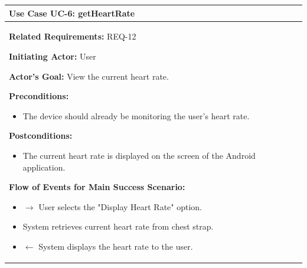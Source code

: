 \documentclass[letterpaper,english, 12pt]{scrreprt}
\begin{document}
\begin{center}
        \begin{tabular}{|C{15cm}|}
                \hline
                        \textbf{Use Case UC-6: getHeartRate}\\
                \hline
                        \begin{flushleft}
                                \textbf{Related Requirements: } REQ-12
                        \end{flushleft}
                        \begin{flushleft}
                                \textbf{Initiating Actor: } User
                        \end{flushleft}
                        \begin{flushleft}
                                \textbf{Actor's Goal: } View the current heart rate.
                        \end{flushleft}
                        \begin{flushleft}
                                \textbf{Preconditions: }
                        \end{flushleft}
                                \begin{itemize}
                                        \item The device should already be monitoring the user's heart rate.
                                \end{itemize}
                        \begin{flushleft}
                                \textbf{Postconditions: }
                        \end{flushleft}
                                \begin{itemize}
                                        \item The current heart rate is displayed on the screen of the Android application.
                                \end{itemize}
                        \begin{flushleft}
                                \textbf{Flow of Events for Main Success Scenario: }
                        \end{flushleft}
                                \begin{itemize}
                                        \item $\rightarrow$ User selects the "Display Heart Rate" option.
                                        \item System retrieves current heart rate from chest strap.
                                        \item $\leftarrow$ System displays the heart rate to the user.
                                \end{itemize}
                \hline
        \end{tabular}
\end{center}
\end{document}
